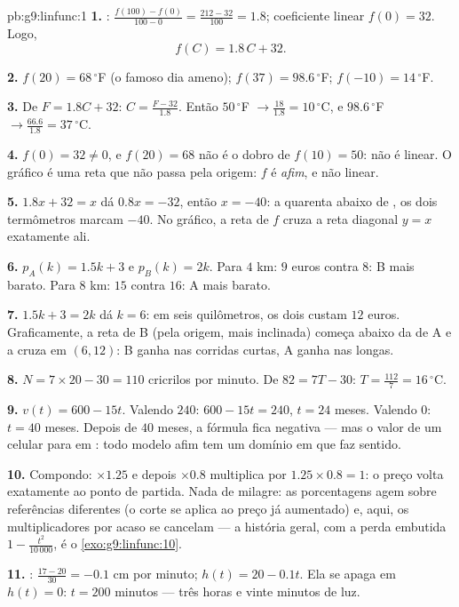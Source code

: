 \begin{solution}{pb:g9:linfunc:1}
\textbf{1.} :
$\frac{f(100) - f(0)}{100 - 0} = \frac{212 - 32}{100} = 1.8$;
coeficiente linear $f(0) = 32$. Logo,
\[
f(C) = 1.8\,C + 32 .
\]

\textbf{2.} $f(20) = 68\,^\circ$F (o famoso dia ameno);
$f(37) = 98.6\,^\circ$F; $f(-10) = 14\,^\circ$F.

\textbf{3.} De $F = 1.8C + 32$: $C = \frac{F - 32}{1.8}$. Então
$50\,^\circ$F $\to \frac{18}{1.8} = 10\,^\circ$C, e $98.6\,^\circ$F
$\to \frac{66.6}{1.8} = 37\,^\circ$C.

\textbf{4.} $f(0) = 32 \neq 0$, e $f(20) = 68$ não é o dobro de
$f(10) = 50$: não é linear. O gráfico é uma reta que não passa pela
origem: $f$ é \emph{afim}, e não linear.

\textbf{5.} $1.8x + 32 = x$ dá $0.8x = -32$, então $x = -40$: a
quarenta abaixo de , os dois termômetros marcam $-40$. No gráfico,
a reta de $f$ cruza a reta diagonal $y = x$ exatamente ali.

\textbf{6.} $p_A(k) = 1.5k + 3$ e $p_B(k) = 2k$. Para $4$ km: $9$
euros contra $8$: B mais barato. Para $8$ km: $15$ contra $16$: A mais
barato.

\textbf{7.} $1.5k + 3 = 2k$ dá $k = 6$: em seis quilômetros, os dois
custam $12$ euros. Graficamente, a reta de B (pela origem, mais
inclinada) começa abaixo da de A e a cruza em $(6, 12)$: B ganha nas
corridas curtas, A ganha nas longas.

\textbf{8.} $N = 7 \times 20 - 30 = 110$ cricrilos por minuto. De
$82 = 7T - 30$: $T = \frac{112}{7} = 16\,^\circ$C.

\textbf{9.} $v(t) = 600 - 15t$. Valendo $240$: $600 - 15t = 240$,
$t = 24$ meses. Valendo $0$: $t = 40$ meses. Depois de $40$ meses, a
fórmula fica negativa --- mas o valor de um celular para em : todo
modelo afim tem um domínio em que faz sentido.

\textbf{10.} Compondo: $\times 1.25$ e depois $\times 0.8$ multiplica
por $1.25 \times 0.8 = 1$: o preço volta exatamente ao ponto de
partida. Nada de milagre: as porcentagens agem sobre referências
diferentes (o corte se aplica ao preço já aumentado) e, aqui, os
multiplicadores por acaso se cancelam --- a história geral, com a perda
embutida $1 - \frac{t^2}{10\,000}$, é o \cref{exo:g9:linfunc:10}.

\textbf{11.} : $\frac{17 - 20}{30} = -0.1$ cm por
minuto; $h(t) = 20 - 0.1t$. Ela se apaga em $h(t) = 0$: $t = 200$
minutos --- três horas e vinte minutos de luz.


\end{solution}
